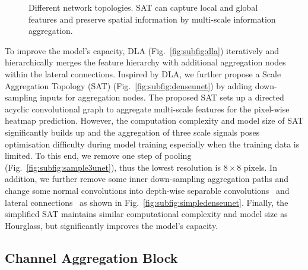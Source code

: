 \documentclass{bmvc2k}
\begin{document}
\begin{figure*}[ht!]
\centering
{}
\caption{Different network topologies. SAT can capture local and global features and preserve spatial information by multi-scale information aggregation.}
\vspace{-4mm}
\label{fig:nettopology}
\end{figure*}

To improve the model's capacity, DLA (Fig.~\ref{fig:subfig:dla}) iteratively and hierarchically merges the feature hierarchy with additional aggregation nodes within the lateral connections. Inspired by DLA, we further propose a Scale Aggregation Topology (SAT) (Fig.~\ref{fig:subfig:denseunet}) by adding down-sampling inputs for aggregation nodes. The proposed SAT sets up a directed acyclic convolutional graph to aggregate multi-scale features for the pixel-wise heatmap prediction. However, the computation complexity and model size of SAT significantly builds up and the aggregation of three scale signals poses optimisation difficulty during model training especially when the training data is limited. To this end, we remove one step of pooling (Fig.~\ref{fig:subfig:sample3unet}), thus the lowest resolution is $8\times8$ pixels. In addition, we further remove some inner down-sampling aggregation paths and change some normal convolutions into depth-wise separable convolutions~\cite{howard2017mobilenets} and lateral connections~\cite{ronneberger2015u} as shown in Fig.~\ref{fig:subfig:simpledenseunet}. Finally, the simplified SAT maintains similar computational complexity and model size as Hourglass, but significantly improves the model's capacity.

\subsection{Channel Aggregation Block}
\end{document}
